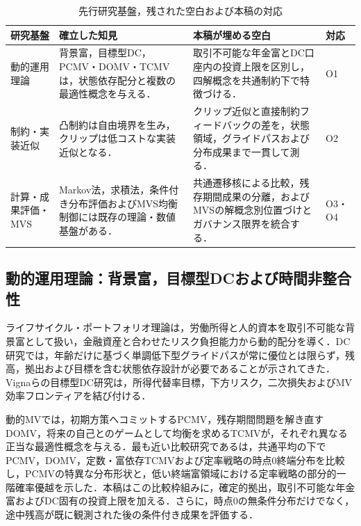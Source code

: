 \documentclass[10pt,a4paper]{article}
\theoremstyle{plain}
\theoremstyle{definition}
\begin{document}
\begin{table}[htbp]
\centering\footnotesize
\caption{先行研究基盤，残された空白および本稿の対応}
\label{tab:literature-positioning}
\begin{tabularx}{\textwidth}{p{31mm}p{47mm}X p{15mm}}
\toprule
研究基盤 & 確立した知見 & 本稿が埋める空白 & 対応 \\
\midrule
動的運用理論
& 背景富，目標型DC，PCMV・DOMV・TCMVは，状態依存配分と複数の最適性概念を与える．
& 取引不可能な年金富とDC口座内の投資上限を区別し，四解概念を共通制約下で特徴づける．
& O1 \\
制約・実装近似
& 凸制約は自由境界を生み，クリップは低コストな実装近似となる．
& クリップ近似と直接制約フィードバックの差を，状態領域，グライドパスおよび分布成果まで一貫して測る．
& O2 \\
計算・成果評価・MVS
& Markov法，求積法，条件付き分布評価およびMVS均衡制御には既存の理論・数値基盤がある．
& 共通遷移核による比較，残存期間成果の分離，およびMVSの解概念別位置づけとガバナンス限界を統合する．
& O3・O4 \\
\bottomrule
\end{tabularx}
\end{table}

\subsection{動的運用理論：背景富，目標型DCおよび時間非整合性}
\label{sec:dynamic-theory-literature}

ライフサイクル・ポートフォリオ理論は，労働所得と人的資本を取引不可能な背景富として扱い，金融資産と合わせたリスク負担能力から動的配分を導く\citep{Merton1969,BodieMertonSamuelson1992,Viceira2001,CoccoGomesMaenhout2005}．DC研究では，年齢だけに基づく単調低下型グライドパスが常に優位とは限らず，残高，拠出および目標を含む状態依存設計が必要であることが示されてきた\citep{CairnsBlakeDowd2006,BasuByrneDrew2011,ForsythVetzal2019,Estrada2019}．Vignaらの目標型DC研究は，所得代替率目標，下方リスク，二次損失およびMV効率フロンティアを結び付ける\citep{VignaHaberman2001,HabermanVigna2002,HojgaardVigna2007,Vigna2014,MenoncinVigna2017}．

動的MVでは，初期方策へコミットするPCMV\citep{LiNg2000,ZhouLi2000}，残存期間問題を解き直すDOMV\citep{PedersenPeskir2017,MenoncinVigna2020}，将来の自己とのゲームとして均衡を求めるTCMV\citep{BasakChabakauri2010,BjorkMurgoci2014,BjorkKhapkoMurgoci2017}が，それぞれ異なる正当な最適性概念を与える．最も近い比較研究である\citet{vanStadenDangForsyth2021}は，共通平均の下でPCMV，DOMV，定数・富依存TCMVおよび定率戦略の時点0終端分布を比較し，PCMVの特異な分布形状と，低い終端富領域における定率戦略の部分的一階確率優越を示した．本稿はこの比較枠組みに，確定的拠出，取引不可能な年金富およびDC固有の投資上限を加える．さらに，時点0の無条件分布だけでなく，途中残高が既に観測された後の条件付き成果を評価する．
\end{document}
